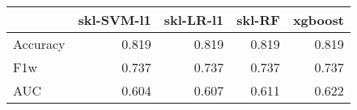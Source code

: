 \begin{tabular}{lrrrr}
\toprule
{} &  skl-SVM-l1 &  skl-LR-l1 &  skl-RF &  xgboost \\
\midrule
Accuracy &       0.819 &      0.819 &   0.819 &    0.819 \\
F1w      &       0.737 &      0.737 &   0.737 &    0.737 \\
AUC      &       0.604 &      0.607 &   0.611 &    0.622 \\
\bottomrule
\end{tabular}
